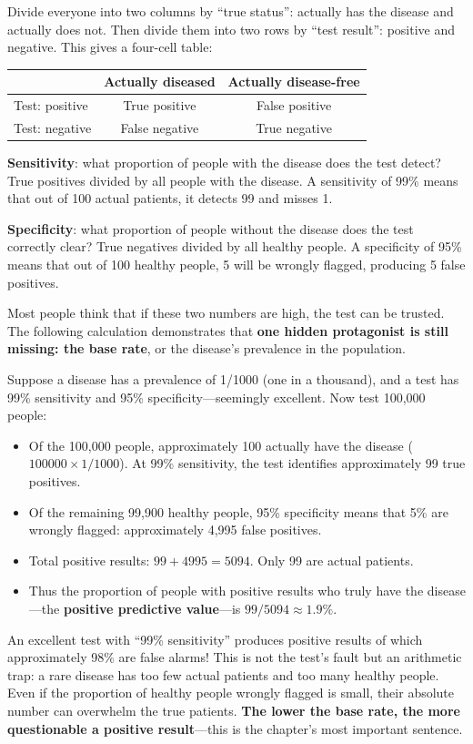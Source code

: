 \begin{qiaoliang}
Divide everyone into two columns by ``true status'': actually has the disease and actually does not. Then divide them into two rows by ``test result'': positive and negative. This gives a four-cell table:

\begin{center}
\begin{tabular}{lcc}
\toprule
 & Actually diseased & Actually disease-free \\
\midrule
Test: positive & True positive & False positive \\
Test: negative & False negative & True negative \\
\bottomrule
\end{tabular}
\end{center}

\textbf{Sensitivity}: what proportion of people with the disease does the test detect? True positives divided by all people with the disease. A sensitivity of 99\% means that out of 100 actual patients, it detects 99 and misses 1.

\textbf{Specificity}: what proportion of people without the disease does the test correctly clear? True negatives divided by all healthy people. A specificity of 95\% means that out of 100 healthy people, 5 will be wrongly flagged, producing 5 false positives.

Most people think that if these two numbers are high, the test can be trusted. The following calculation demonstrates that \textbf{one hidden protagonist is still missing: the base rate}, or the disease's prevalence in the population.

Suppose a disease has a prevalence of 1/1000 (one in a thousand), and a test has 99\% sensitivity and 95\% specificity---seemingly excellent. Now test 100,000 people:

\begin{itemize}[itemsep=2pt]
\item Of the 100,000 people, approximately 100 actually have the disease ($100000 \times 1/1000$). At 99\% sensitivity, the test identifies approximately 99 true positives.
\item Of the remaining 99,900 healthy people, 95\% specificity means that 5\% are wrongly flagged: approximately 4,995 false positives.
\item Total positive results: $99 + 4995 = 5094$. Only 99 are actual patients.
\item Thus the proportion of people with positive results who truly have the disease---the \textbf{positive predictive value}---is $99/5094 \approx 1.9\%$.
\end{itemize}

An excellent test with ``99\% sensitivity'' produces positive results of which approximately 98\% are false alarms! This is not the test's fault but an arithmetic trap: a rare disease has too few actual patients and too many healthy people. Even if the proportion of healthy people wrongly flagged is small, their absolute number can overwhelm the true patients. \textbf{The lower the base rate, the more questionable a positive result}---this is the chapter's most important sentence.
\end{qiaoliang}


